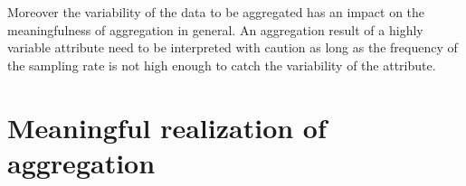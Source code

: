 \documentclass[12pt, oneside, a4paper]{scrbook}
\begin{document}
Moreover the variability of the data to be aggregated has an impact on the meaningfulness of aggregation in general. An aggregation result of a highly variable attribute need to be interpreted with caution as long as the frequency of the sampling rate is not high enough to catch the variability of the attribute.
\par\medskip








\section{Meaningful realization of aggregation}
\label{sec:meaningfulrealization}
\end{document}
